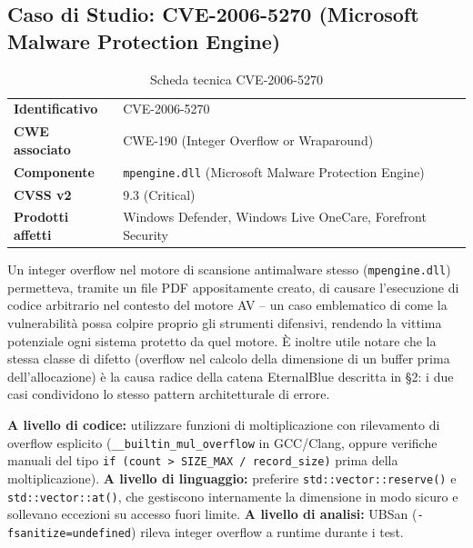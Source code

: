 \documentclass[11pt,a4paper]{article}
\begin{document}
\subsection{Caso di Studio: CVE-2006-5270 (Microsoft Malware Protection Engine)}

\begin{table}[h]
\centering
\begin{tabular}{@{}ll@{}}
\toprule
\textbf{Identificativo} & CVE-2006-5270 \\
\textbf{CWE associato} & CWE-190 (Integer Overflow or Wraparound) \\
\textbf{Componente} & \texttt{mpengine.dll} (Microsoft Malware Protection Engine) \\
\textbf{CVSS v2} & 9.3 (Critical) \\
\textbf{Prodotti affetti} & Windows Defender, Windows Live OneCare, Forefront Security \\
\bottomrule
\end{tabular}
\caption{Scheda tecnica CVE-2006-5270}
\end{table}

Un integer overflow nel motore di scansione antimalware stesso (\texttt{mpengine.dll}) permetteva, tramite un file PDF appositamente creato, di causare l'esecuzione di codice arbitrario nel contesto del motore AV -- un caso emblematico di come la vulnerabilità possa colpire proprio gli strumenti difensivi, rendendo la vittima potenziale ogni sistema protetto da quel motore. È inoltre utile notare che la stessa classe di difetto (overflow nel calcolo della dimensione di un buffer prima dell'allocazione) è la causa radice della catena EternalBlue descritta in \S2: i due casi condividono lo stesso pattern architetturale di errore.

\begin{mitigationbox}
\textbf{A livello di codice:} utilizzare funzioni di moltiplicazione con rilevamento di overflow esplicito (\texttt{\_\_builtin\_mul\_overflow} in GCC/Clang, oppure verifiche manuali del tipo \texttt{if (count > SIZE\_MAX / record\_size)} prima della moltiplicazione). \textbf{A livello di linguaggio:} preferire \texttt{std::vector::reserve()} e \texttt{std::vector::at()}, che gestiscono internamente la dimensione in modo sicuro e sollevano eccezioni su accesso fuori limite. \textbf{A livello di analisi:} UBSan (\texttt{-fsanitize=undefined}) rileva integer overflow a runtime durante i test.
\end{mitigationbox}

\end{document}
